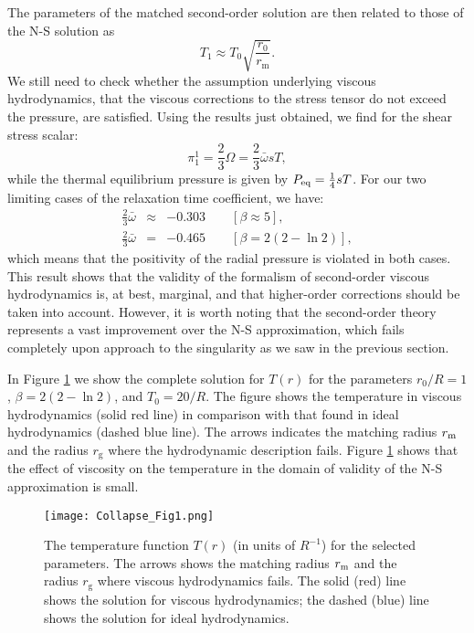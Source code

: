 \documentclass[article,twocolumn]{revtex4}
\newcommand{\be}{\begin{equation}}
\newcommand{\ee}{\end{equation}}
\newcommand{\ba}{\begin{eqnarray}}
\newcommand{\ea}{\end{eqnarray}}
\begin{document}
The parameters of the matched second-order solution are then related to those of the N-S solution as
\be
T_1 \approx T_0 \sqrt{\frac{r_0}{r_\mathrm{m}}} .
\label{eq:T1}
\ee
We still need to check whether the assumption underlying viscous hydrodynamics, that the viscous corrections to the stress tensor do not exceed the pressure, are satisfied. Using the results just obtained, we find for the shear stress scalar:
\be 
\pi^1_1 = \frac{2}{3} \Omega = \frac{2}{3} \bar\omega s T ,
\ee
while the thermal equilibrium pressure is given by $P_{\rm eq} = \frac{1}{4} s T$. For our two limiting cases of the relaxation time coefficient, we have:
\ba
\frac{2}{3} \bar\omega &\approx & -0.303 \qquad [\beta \approx 5] ,
\\
\frac{2}{3} \bar\omega &=& -0.465 \qquad [\beta = 2(2-\ln2)] ,
\ea
which means that the positivity of the radial pressure is violated in both cases. This result shows that the validity of the formalism of second-order viscous hydrodynamics is, at best, marginal, and that higher-order corrections should be taken into account. However, it is worth noting that the second-order theory represents a vast improvement over the N-S approximation, which fails completely upon approach to the singularity as we saw in the previous section.

In Figure \ref{fig1} we show the complete solution for $T(r)$ for the parameters $r_0/R = 1$, $\beta = 2(2-\ln 2)$, and $T_0 = 20/R$.  The figure shows the temperature in viscous hydrodynamics (solid red line) in comparison with that found in ideal hydrodynamics (dashed blue line). The arrows indicates the matching radius $r_{\rm m}$ and the radius $r_\mathrm{g}$ where the hydrodynamic description fails. Figure \ref{fig1} shows that the effect of viscosity on the temperature in the domain of validity of the N-S approximation is small.

\begin{figure}[htb]   
\texttt{[image: Collapse\_Fig1.png]}
\caption{The temperature function $T(r)$ (in units of $R^{-1}$) for the selected parameters. The arrows shows the matching radius $r_{\rm m}$ and the radius $r_\mathrm{g}$ where viscous hydrodynamics fails. The solid (red) line shows the solution for viscous hydrodynamics; the dashed (blue) line shows the solution for ideal hydrodynamics.}
\label{fig1}
\end{figure}
\end{document}
